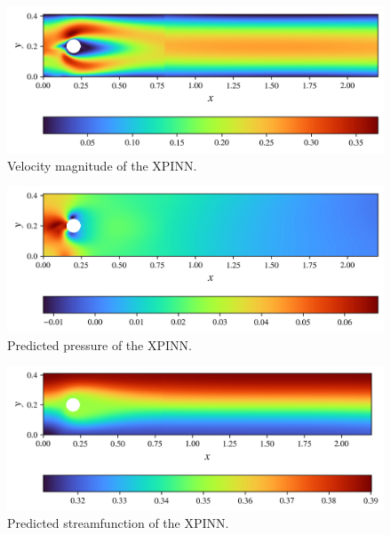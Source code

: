 \begin{figure}[h!]
    \centering
    \includegraphics[width=\linewidth]{Project1XPINNs/figures/NavierStokes/TwoBoxDecomp/TB_10000_iter_right_emphasis/solution/flow_magnitude_two_box.png}
    \caption{Velocity magnitude of the XPINN.}
    \label{fig:NS_XPINN_flow_mag}
\end{figure}

\begin{figure}[h!]
    \centering
    \includegraphics[width=\linewidth]{Project1XPINNs/figures/NavierStokes/TwoBoxDecomp/TB_10000_iter_right_emphasis/solution/pressure_two_box.png}
    \caption{Predicted pressure of the XPINN.}
    \label{fig:NS_XPINN_pressure}
\end{figure}

\begin{figure}[h!]
    \centering
    \includegraphics[width=\linewidth]{Project1XPINNs/figures/NavierStokes/TwoBoxDecomp/TB_10000_iter_right_emphasis/solution/streamfunc_two_box.png}
    \caption{Predicted streamfunction of the XPINN.}
    \label{fig:NS_XPINN_streamfunc}
\end{figure}

